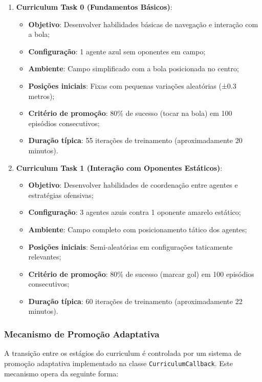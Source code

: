 \begin{enumerate}
    \item \textbf{Curriculum Task 0 (Fundamentos Básicos)}: 
    \begin{itemize}
        \item \textbf{Objetivo}: Desenvolver habilidades básicas de navegação e interação com a bola;
        \item \textbf{Configuração}: 1 agente azul sem oponentes em campo;
        \item \textbf{Ambiente}: Campo simplificado com a bola posicionada no centro;
        \item \textbf{Posições iniciais}: Fixas com pequenas variações aleatórias (±0.3 metros);
        \item \textbf{Critério de promoção}: 80\% de sucesso (tocar na bola) em 100 episódios consecutivos;
        \item \textbf{Duração típica}: 55 iterações de treinamento (aproximadamente 20 minutos).
    \end{itemize}
    
    \item \textbf{Curriculum Task 1 (Interação com Oponentes Estáticos)}:
    \begin{itemize}
        \item \textbf{Objetivo}: Desenvolver habilidades de coordenação entre agentes e estratégias ofensivas;
        \item \textbf{Configuração}: 3 agentes azuis contra 1 oponente amarelo estático;
        \item \textbf{Ambiente}: Campo completo com posicionamento tático dos agentes;
        \item \textbf{Posições iniciais}: Semi-aleatórias em configurações taticamente relevantes;
        \item \textbf{Critério de promoção}: 80\% de sucesso (marcar gol) em 100 episódios consecutivos;
        \item \textbf{Duração típica}: 60 iterações de treinamento (aproximadamente 22 minutos).
    \end{itemize}
\end{enumerate}

\subsubsection{Mecanismo de Promoção Adaptativa}

A transição entre os estágios do curriculum é controlada por um sistema de promoção adaptativa implementado na classe \texttt{CurriculumCallback}. Este mecanismo opera da seguinte forma:

